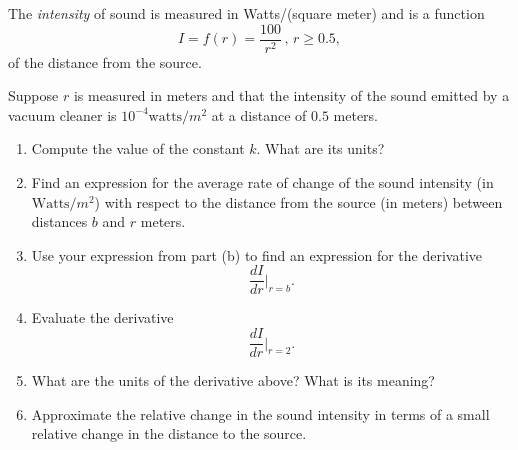 \documentclass{ximera}
\begin{document}
\begin{question}  \label{Qdfdgt446666}
The \emph{intensity} of sound is measured in Watts/(square meter) and is a function 
\[
          I = f(r) = \frac{100}{r^2} \, , \, r\geq 0.5 ,
\]
of the distance from the source. 

Suppose $r$ is measured in meters and that the intensity of the sound emitted by a vacuum cleaner is $10^{-4}\text{watts}/m^2$ at a distance of $0.5$ meters.

\begin{enumerate}

\item Compute the value of the constant $k$. What are its units?

\item Find an expression for the average rate of change of the sound intensity (in $\text{Watts}/m^2$) with respect to the distance from the source (in meters) between distances $b$ and $r$ meters.

\item Use your expression from part (b) to find an expression for the derivative 
\[
   \frac{dI}{dr} \Big|_{r=b}  .
\]

\item Evaluate the derivative
\[
       \frac{dI}{dr} \Big|_{r=2} .
\]

\item What are the units of the derivative above? What is its meaning?

\item Approximate the relative change in the sound intensity in terms of a small relative change in the distance to the source.
\end{enumerate}

\end{question}
\end{document}
